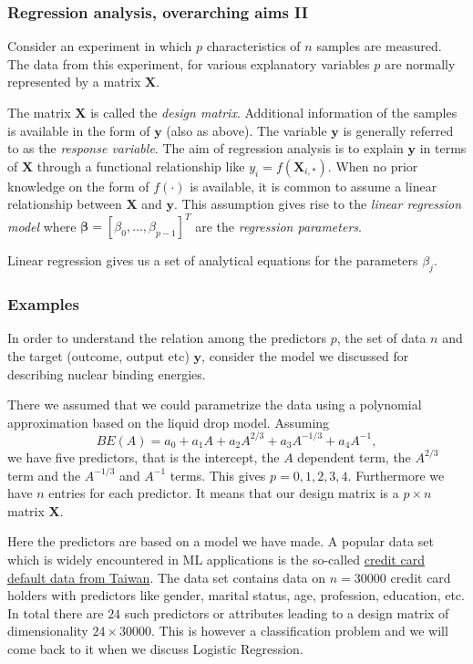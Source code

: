 \documentclass{beamer}
\begin{document}
\begin{frame}
\frametitle{Regression analysis, overarching aims II}

\begin{block}{}

Consider an experiment in which $p$ characteristics of $n$ samples are
measured. The data from this experiment, for various explanatory variables $p$ are normally represented by a matrix  
$\mathbf{X}$.

The matrix $\mathbf{X}$ is called the \emph{design
matrix}. Additional information of the samples is available in the
form of $\bm{y}$ (also as above). The variable $\bm{y}$ is
generally referred to as the \emph{response variable}. The aim of
regression analysis is to explain $\bm{y}$ in terms of
$\bm{X}$ through a functional relationship like $y_i =
f(\mathbf{X}_{i,\ast})$. When no prior knowledge on the form of
$f(\cdot)$ is available, it is common to assume a linear relationship
between $\bm{X}$ and $\bm{y}$. This assumption gives rise to
the \emph{linear regression model} where $\bm{\beta} = [\beta_0, \ldots,
\beta_{p-1}]^{T}$ are the \emph{regression parameters}. 

Linear regression gives us a set of analytical equations for the parameters $\beta_j$.

\end{block}
\end{frame}

\begin{frame}
\frametitle{Examples}

\begin{block}{}
In order to understand the relation among the predictors $p$, the set of data $n$ and the target (outcome, output etc) $\bm{y}$,
consider the model we discussed for describing nuclear binding energies. 

There we assumed that we could parametrize the data using a polynomial approximation based on the liquid drop model.
Assuming 
\[
BE(A) = a_0+a_1A+a_2A^{2/3}+a_3A^{-1/3}+a_4A^{-1},
\]
we have five predictors, that is the intercept, the $A$ dependent term, the $A^{2/3}$ term and the $A^{-1/3}$ and $A^{-1}$ terms.
This gives $p=0,1,2,3,4$. Furthermore we have $n$ entries for each predictor. It means that our design matrix is a 
$p\times n$ matrix $\bm{X}$.

Here the predictors are based on a model we have made. A popular data set which is widely encountered in ML applications is the
so-called \href{{https://www.sciencedirect.com/science/article/pii/S0957417407006719?via%3Dihub}}{credit card default data from Taiwan}. The data set contains data on $n=30000$ credit card holders with predictors like gender, marital status, age, profession, education, etc. In total there are $24$ such predictors or attributes leading to a design matrix of dimensionality $24 \times 30000$. This is however a classification problem and we will come back to it when we discuss Logistic Regression. 

\end{block}
\end{frame}
\end{document}
